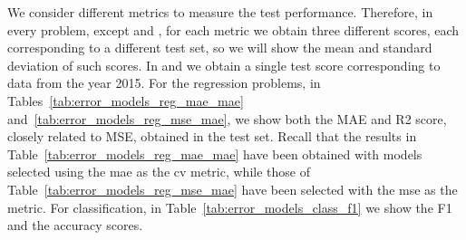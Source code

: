 We consider different metrics to measure the test performance. Therefore, in every problem, except  and , for each metric we obtain three different scores, each corresponding to a different test set, so we will show the mean and standard deviation of such scores. In  and  we obtain a single test score corresponding to data from the year 2015.
% 
For the regression problems, in Tables~\ref{tab:error_models_reg_mae_mae} and~\ref{tab:error_models_reg_mse_mae}, we show both the MAE and R2 score, closely related to MSE, obtained in the test set. 
Recall that the results in Table~\ref{tab:error_models_reg_mae_mae} have been obtained with models selected using the \acrshort{mae} as the \acrshort{cv} metric, while those of Table~\ref{tab:error_models_reg_mse_mae} have been selected with the \acrshort{mse} as the metric.
%
For classification, in Table~\ref{tab:error_models_class_f1} we show the F1 and the accuracy scores.
%






